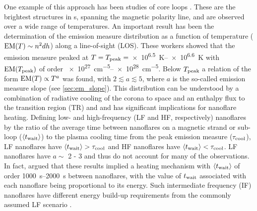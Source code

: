 One example of this approach has been studies of \AR{} core loops \citep{warren_constraints_2011,warren_systematic_2012,winebarger_using_2011,tripathi_emission_2011,schmelz_cold_2012,bradshaw_diagnosing_2012,reep_diagnosing_2013,del_zanna_evolution_2015}. These are the brightest structures in \AR s, spanning the magnetic polarity line, and are observed over a wide range of temperatures. An important result has been the determination of the emission measure distribution as a function of temperature ($\emd[T]\sim n^2dh$) along a line-of-sight (LOS). These workers showed that the emission measure peaked at $T = T_\textup{peak} = $\SIrange{e6.5}{e6.6}{\kelvin} with $\emd[T_\textup{peak}]$ of order \SIrange{e27}{e28}{\cm\tothe{-5}}. Below $T_\textup{peak}$ a relation of the form $\emd[T] \propto T^a$ was found, with $2\lesssim a\lesssim 5$, where $a$ is the so-called emission measure slope (see \autoref{sec:em_slope}). This distribution can be understood by a combination of radiative cooling of the corona to space and an enthalpy flux to the transition region (TR) \citep[e.g.][]{bradshaw_cooling_2010,bradshaw_new_2010} and and has significant implications for nanoflare heating. Defining low- and high-frequency (LF and HF, respectively) nanoflares by the ratio of the average time between nanoflares on a magnetic strand or sub-loop ($\langle \twait \rangle$) to the plasma cooling time from the peak emission measure ($\tau_\textup{cool}$), LF nanoflares have $\langle \twait \rangle > \tau_\textup{cool}$ and HF nanoflares have $\langle \twait \rangle < \tau_\textup{cool}$. LF nanoflares have $a \sim$ 2 - 3 and thus do not account for many of the observations. In fact, \citet{cargill_active_2014} argued that these results implied a heating mechanism with $\langle \twait \rangle$ of order \SIrange{1000}{2000}{\second} between nanoflares, with the value of $\twait$ associated with each nanoflare being proportional to its energy. Such intermediate frequency (IF) nanoflares have different energy build-up requirements from the commonly assumed LF scenario \citep{cargill_active_2014}.

